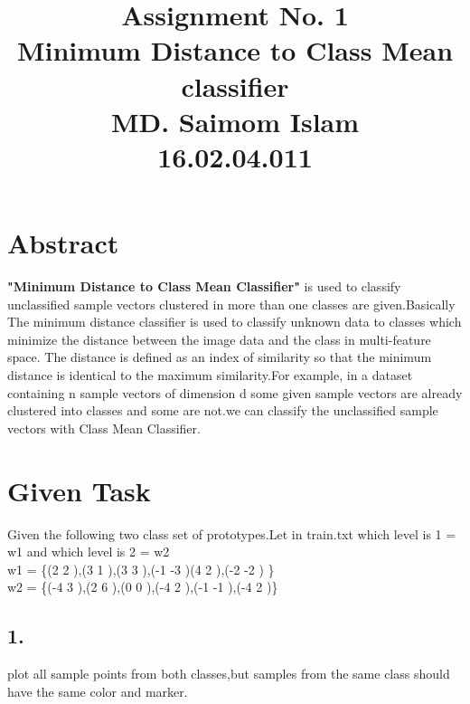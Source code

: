 \documentclass[12pt]{article}
\begin{document}
\title
{{\textbf{Assignment No. 1\\ }}
Minimum Distance to Class Mean classifier\\
MD. Saimom Islam\\
16.02.04.011
}

\maketitle







\section{Abstract}
\textbf{"Minimum Distance to Class Mean Classifier"} is used to classify unclassified sample vectors clustered in more than one classes are given.Basically The minimum distance classifier is used to classify unknown  data to classes which minimize the distance between the image data and the class in multi-feature space. The distance is defined as an index of similarity so that the minimum distance is identical to the maximum similarity.For example, in a dataset containing n sample vectors of dimension d some given sample vectors are already clustered into classes and some are not.we can classify the unclassified sample vectors with Class Mean Classifier.

\section {Given Task}
Given the following two class set of prototypes.Let in train.txt which level is 1 = w1 and which level is 2 = w2\\
w1 = \{(2 2 ),(3 1 ),(3 3 ),(-1 -3 )(4 2 ),(-2 -2 ) \}\\
w2 = \{(-4 3 ),(2 6 ),(0 0 ),(-4 2 ),(-1 -1 ),(-4 2 )\}\\

\subsection *{1.}
 plot all sample points from both classes,but samples from the same class  should have the same color and marker.\\
\end{document}
